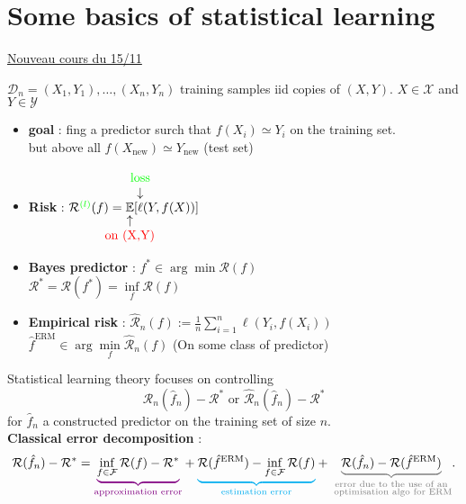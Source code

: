 \chapter{Some basics of statistical learning}

\underline{Nouveau cours du 15/11} 

$\mathcal{D}_n = {(X_1, Y_1), \dots, (X_n,Y_n)}$ training samples iid copies of $(X,Y)$. $X \in \mathcal{X}$ and $Y \in \mathcal{Y}$ 

\begin{itemize}
    \item \textbf{goal} : fing a predictor surch that $f(X_i) \simeq Y_i$ on the training set. \\
    but above all $f(X_{\text{new}}) \simeq Y_{\text{new}}$ (test set) 
    \item \textbf{Risk} : $\mathcal{R}^{\textcolor{green}{(l)} }(f) = \underarrow[\mathbb{E}][\uparrow]{\textcolor{red}{on (X,Y)}} [ \overarrow[\ell][\downarrow]{\textcolor{green}{loss}}(Y, f(X))]$
    \item \textbf{Bayes predictor} : $f^\ast  \in \arg \min \mathcal{R}(f)$ \\
    $ \mathcal{R}^\ast = \mathcal{R}(f^\ast) = \inf \limits_{f} \mathcal{R}(f) $
    \item \textbf{Empirical risk} : $\hat{\mathcal{R}}_n (f) := \frac{1}{n} \sum \limits_{i=1}^{n} \ell (Y_i, f(X_i))$ \\
    $\hat{f}^{\text{ERM}} \in  \arg \min \limits_f \hat{\mathcal{R}}_n (f) $ (On some class of predictor)
\end{itemize}

Statistical learning theory focuses on controlling 
\[
    \mathcal{R}_n (\hat{f}_n) - \mathcal{R}^\ast  \text{  or  } \hat{\mathcal{R}}_n (\hat{f}_n) - \mathcal{R}^\ast
\]
for $\hat{f}_n$ a constructed predictor on the training set of size $n$. \\

\textbf{Classical error decomposition} :
\[
    \mathcal{R} (\hat{f}_n) - \mathcal{R}^\ast = 
    \textcolor{violet}{\underbrace{\color{black}\inf_{f \in \mathcal{F}} \mathcal{R}(f) - \mathcal{R}^\ast }_{\text{approximation error}} } 
    + \textcolor{cyan}{\underbrace{\color{black} \mathcal{R}(\hat{f}^\text{ERM}) - \inf_{f \in \mathcal{F}} \mathcal{R}(f) }_{\text{estimation error}} }
    +  \textcolor{gray}{\underbrace{\color{black} \mathcal{R} (\hat{f}_n) - \mathcal{R}(\hat{f}^\text{ERM}) }_{\substack{\text{error due to the use of an} \\ \text{ optimisation algo for ERM} } }}
.\]





